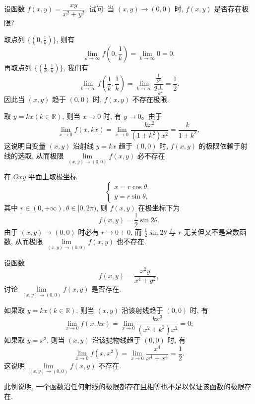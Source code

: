 \begin{example}\label{example:ma-13-2-3}
设函数 $f(x,y)=\dfrac{xy}{x^2+y^2}$, 试问: 当 $(x,y)\to(0,0)$ 时, $f(x,y)$ 是否存在极限?
\end{example}


\begin{solve}[{解法 1}]
取点列 $\{(0,\frac1k)\}$, 则有
\[
  \lim_{k\to\infty}f\left(0,\frac1k\right)=\lim_{k\to\infty}0=0.
\]
再取点列 $\{(\frac1k,\frac1k)\}$, 我们有
\[
  \lim_{k\to\infty}f\left(\frac1k,\frac1k\right)
  =\lim_{k\to\infty}\frac{\frac1{k^2}}{2\frac1{k^2}}=\frac12.
\]
因此当 $(x,y)$ 趋于 $(0,0)$ 时, $f(x,y)$ 不存在极限.
\end{solve}


\begin{solve}[{解法 2}]
取 $y=kx(k\in\mathbb R)$, 则当 $x\to0$ 时, 有 $y\to0$。由于
\[
  \lim_{x\to0}f(x,kx)
  =\lim_{x\to0}\frac{kx^2}{(1+k^2)x^2}
  =\frac{k}{1+k^2},
\]
这说明自变量 $(x,y)$ 沿射线 $y=kx$ 趋于 $(0,0)$ 时, $f(x,y)$ 的极限依赖于射线的选取, 从而极限 $\lim\limits_{(x,y)\to(0,0)}f(x,y)$ 必不存在.
\end{solve}


\begin{solve}[{解法 3}]
在 $Oxy$ 平面上取极坐标
\[
  \begin{cases}
    x=r\cos\theta,\\
    y=r\sin\theta,
  \end{cases}
\]
其中 $r\in(0,+\infty),\theta\in[0,2\pi)$, 则 $f(x,y)$ 在极坐标下为
\[
  f(x,y)=\frac12\sin2\theta.
\]
由于 $(x,y)\to(0,0)$ 时必有 $r\to0+0$, 而 $\frac12\sin2\theta$ 与 $r$ 无关但又不是常数函数, 从而极限 $\lim\limits_{(x,y)\to(0,0)}f(x,y)$ 也不存在.
\end{solve}


\begin{example}\label{example:ma-13-2-4}
设函数
\[
  f(x,y)=\frac{x^2y}{x^4+y^2},
\]
讨论 $\lim\limits_{(x,y)\to(0,0)}f(x,y)$ 是否存在.
\end{example}


\begin{solve}
如果取 $y=kx(k\in\mathbb R)$, 则当 $(x,y)$ 沿该射线趋于 $(0,0)$ 时, 有
\[
  \lim_{x\to0}f(x,kx)=\lim_{x\to0}\frac{kx^3}{(x^2+k^2)x^2}=0;
\]
如果取 $y=x^2$, 则当 $(x,y)$ 沿该抛物线趋于 $(0,0)$ 时, 有
\[
  \lim_{x\to0}f(x,x^2)=\lim_{x\to0}\frac{x^4}{x^4+x^4}=\frac12.
\]
这说明 $\lim\limits_{(x,y)\to(0,0)}f(x,y)$ 不存在.

此例说明, 一个函数沿任何射线的极限都存在且相等也不足以保证该函数的极限存在.
\end{solve}


